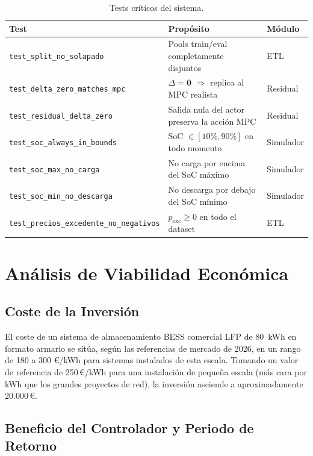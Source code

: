 \documentclass[12pt, a4paper, twoside]{report}
\begin{document}
\begin{table}[H]
\centering
\caption{Tests críticos del sistema.}
\label{tab:tests}
\begin{tabularx}{\textwidth}{lXl}
\toprule
\textbf{Test} & \textbf{Propósito} & \textbf{Módulo} \\
\midrule
\texttt{test\_split\_no\_solapado} & Pools train/eval completamente disjuntos & ETL \\
\texttt{test\_delta\_zero\_matches\_mpc} & $\Delta=\mathbf{0}$ $\Rightarrow$ replica al MPC realista & Residual \\
\texttt{test\_residual\_delta\_zero} & Salida nula del actor preserva la acción MPC & Residual \\
\texttt{test\_soc\_always\_in\_bounds} & SoC $\in [10\%, 90\%]$ en todo momento & Simulador \\
\texttt{test\_soc\_max\_no\_carga} & No carga por encima del SoC máximo & Simulador \\
\texttt{test\_soc\_min\_no\_descarga} & No descarga por debajo del SoC mínimo & Simulador \\
\texttt{test\_precios\_excedente\_no\_negativos} & $p_{\text{exc}} \geq 0$ en todo el dataset & ETL \\
\bottomrule
\end{tabularx}
\end{table}

\chapter{Análisis de Viabilidad Económica}
\label{app:viabilidad}

\section{Coste de la Inversión}

El coste de un sistema de almacenamiento BESS comercial LFP de \SI{80}{kWh} en
formato armario se sitúa, según las referencias de mercado de 2026, en un rango
de 180 a 300 €/kWh para sistemas instalados de esta escala. Tomando un valor de
referencia de 250\,€/kWh para una instalación de pequeña escala (más cara
por kWh que los grandes proyectos de red), la inversión asciende a
aproximadamente 20.000\,€.

\section{Beneficio del Controlador y Periodo de Retorno}
\end{document}
